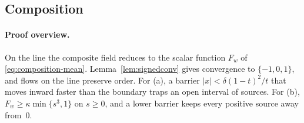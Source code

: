 \documentclass{article} %
\theoremstyle{plain}
\theoremstyle{definition}
\theoremstyle{remark}
\begin{document}
\subsection{Composition}
\label{apx:pf-composition}

\thmcomposition*
\paragraph{Proof overview.} On the line the composite field reduces to the scalar
function $F_w$ of \eqref{eq:composition-mean}. Lemma~\ref{lem:signedconv} gives convergence to
$\{-1,0,1\}$, and flows on the line preserve order. For (a), a barrier $|x|<\delta(1-t)^2/t$ that
moves inward faster than the boundary traps an open interval of sources. For (b),
$F_w\ge\kappa\min\{s^3,1\}$ on $s\ge0$, and a lower barrier keeps every positive source away
from~$0$.
\end{document}
